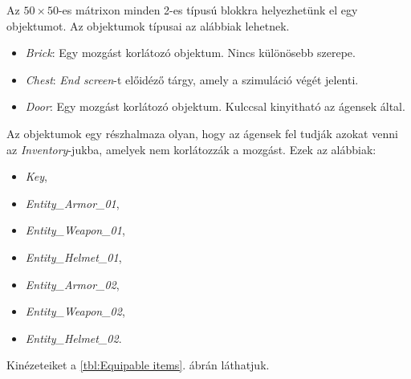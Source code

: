 Az $50 \times 50$-es mátrixon minden 2-es típusú blokkra helyezhetünk el egy objektumot. Az objektumok típusai az alábbiak lehetnek.

\begin{itemize}
\item \textit{Brick}: Egy mozgást korlátozó objektum. Nincs különösebb szerepe.
\item \textit{Chest}: \textit{End screen}-t előidéző tárgy, amely a szimuláció végét jelenti.
\item \textit{Door}: Egy mozgást korlátozó objektum. Kulccsal kinyitható az ágensek által.
\end{itemize}

Az objektumok egy részhalmaza olyan, hogy az ágensek fel tudják azokat venni az \textit{Inventory}-jukba, amelyek nem korlátozzák a mozgást. Ezek az alábbiak:
\begin{itemize}
\item \textit{Key},
\item \textit{Entity\_Armor\_01},
\item \textit{Entity\_Weapon\_01},
\item \textit{Entity\_Helmet\_01},
\item \textit{Entity\_Armor\_02},
\item \textit{Entity\_Weapon\_02},
\item \textit{Entity\_Helmet\_02}.
\end{itemize}

Kinézeteiket a \ref{tbl:Equipable items}. ábrán láthatjuk.

